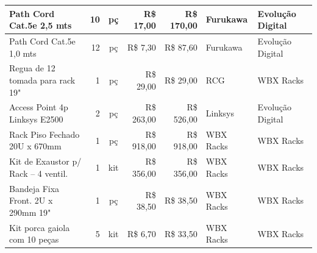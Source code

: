 \documentclass[	DIV=calc,%
							paper=a4,%
							fontsize=12pt,%
							onecolumn]{scrartcl}	 					%
\begin{document}
\begin{table}[H]
{\begin{tabular}{lrcrrll}
		\multicolumn{1}{|l|}{Path Cord Cat.5e 2,5 mts}             & \multicolumn{1}{r|}{10}            & \multicolumn{1}{c|}{pç}            & \multicolumn{1}{r|}{R\$ 17,00}            & \multicolumn{1}{r|}{R\$ 170,00}        & \multicolumn{1}{l|}{Furukawa}       & \multicolumn{1}{l|}{Evolução Digital}     \\ \hline
		\multicolumn{1}{|l|}{Path Cord Cat.5e 1,0 mts}             & \multicolumn{1}{r|}{12}            & \multicolumn{1}{c|}{pç}            & \multicolumn{1}{r|}{R\$ 7,30}             & \multicolumn{1}{r|}{R\$ 87,60}         & \multicolumn{1}{l|}{Furukawa}       & \multicolumn{1}{l|}{Evolução Digital}     \\ \hline
		\multicolumn{1}{|l|}{Regua de 12 tomada para rack 19"}     & \multicolumn{1}{r|}{1}             & \multicolumn{1}{c|}{pç}            & \multicolumn{1}{r|}{R\$ 29,00}            & \multicolumn{1}{r|}{R\$ 29,00}         & \multicolumn{1}{l|}{RCG}            & \multicolumn{1}{l|}{WBX Racks}            \\ \hline
		\multicolumn{1}{|l|}{Access Point 4p Linksys E2500}        & \multicolumn{1}{r|}{2}             & \multicolumn{1}{c|}{pç}            & \multicolumn{1}{r|}{R\$ 263,00}           & \multicolumn{1}{r|}{R\$ 526,00}        & \multicolumn{1}{l|}{Linksys}        & \multicolumn{1}{l|}{Evolução Digital}     \\ \hline
		\multicolumn{1}{|l|}{Rack Piso Fechado 20U x 670mm}        & \multicolumn{1}{r|}{1}             & \multicolumn{1}{c|}{pç}            & \multicolumn{1}{r|}{R\$ 918,00}           & \multicolumn{1}{r|}{R\$ 918,00}        & \multicolumn{1}{l|}{WBX Racks}      & \multicolumn{1}{l|}{WBX Racks}            \\ \hline
		\multicolumn{1}{|l|}{Kit de Exaustor p/ Rack – 4 ventil.}  & \multicolumn{1}{r|}{1}             & \multicolumn{1}{c|}{kit}           & \multicolumn{1}{r|}{R\$ 356,00}           & \multicolumn{1}{r|}{R\$ 356,00}        & \multicolumn{1}{l|}{WBX Racks}      & \multicolumn{1}{l|}{WBX Racks}            \\ \hline
		\multicolumn{1}{|l|}{Bandeja Fixa Front. 2U x 290mm 19"}   & \multicolumn{1}{r|}{1}             & \multicolumn{1}{c|}{pç}            & \multicolumn{1}{r|}{R\$ 38,50}            & \multicolumn{1}{r|}{R\$ 38,50}         & \multicolumn{1}{l|}{WBX Racks}      & \multicolumn{1}{l|}{WBX Racks}            \\ \hline
		\multicolumn{1}{|l|}{Kit porca gaiola com 10 peças}        & \multicolumn{1}{r|}{5}             & \multicolumn{1}{c|}{kit}           & \multicolumn{1}{r|}{R\$ 6,70}             & \multicolumn{1}{r|}{R\$ 33,50}         & \multicolumn{1}{l|}{WBX Racks}      & \multicolumn{1}{l|}{WBX Racks}            \\ \hline

\end{tabular}}
\end{table}
\end{document}
